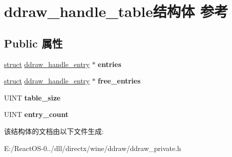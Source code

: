 \hypertarget{structddraw__handle__table}{}\section{ddraw\+\_\+handle\+\_\+table结构体 参考}
\label{structddraw__handle__table}
\subsection*{Public 属性}
\begin{DoxyCompactItemize}
\item 
\mbox{\label{structddraw__handle__table_a7c3668467c77f874e839c0ed041d3979}} 
\hyperlink{interfacestruct}{struct} \hyperlink{structddraw__handle__entry}{ddraw\+\_\+handle\+\_\+entry} $\ast$ {\bfseries entries}
\item 
\mbox{\label{structddraw__handle__table_a32c6e56b448780c1332e05d23e5e70f1}} 
\hyperlink{interfacestruct}{struct} \hyperlink{structddraw__handle__entry}{ddraw\+\_\+handle\+\_\+entry} $\ast$ {\bfseries free\+\_\+entries}
\item 
\mbox{\label{structddraw__handle__table_ae887e9c5a92d0ebeb60c898393d2b7f6}} 
U\+I\+NT {\bfseries table\+\_\+size}
\item 
\mbox{\label{structddraw__handle__table_a2265b8c1dc72f4aafd9230e00f532601}} 
U\+I\+NT {\bfseries entry\+\_\+count}
\end{DoxyCompactItemize}


该结构体的文档由以下文件生成\+:\begin{DoxyCompactItemize}
\item 
E\+:/\+React\+O\+S-\/0../dll/directx/wine/ddraw/ddraw\+\_\+private.\+h\end{DoxyCompactItemize}
